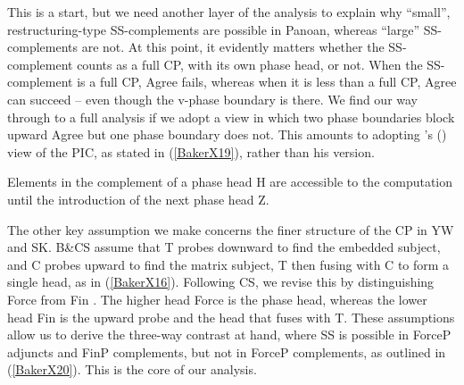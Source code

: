\documentclass[output=paper]{langscibook}
\begin{document}
This is a start, but we need another layer of the analysis to explain why “small”, restructuring-type SS-complements are possible in Panoan, whereas “large” SS-complements are not. At this point, it evidently matters whether the SS-com\-ple\-ment counts as a full CP, with its own phase head, or not. When the SS-complement is a full CP, Agree fails, whereas when it is less than a full CP, Agree can succeed – even though the v-phase boundary is there. We find our way through to a full analysis if we adopt a view in which two phase boundaries block upward Agree but one phase boundary does not. This amounts to adopting \citeauthor{chomsky2001derivation}'s (\citeyear[13--14]{chomsky2001derivation}) view of the PIC, as stated in (\ref{BakerX19}), rather than his \citeyearpar{chomsky2000minimalist} version.\largerpage

\begin{exe}
\ex Elements in the complement of a phase head H are accessible to the computation until the introduction of the next phase head Z. \label{BakerX19}
\end{exe}

The other key assumption we make concerns the finer structure of the CP in YW and SK. B\&CS assume that T probes downward to find the embedded subject, and C probes upward to find the matrix subject, T then fusing with C to form a single head, as in (\ref{BakerX16}). Following CS, we revise this by distinguishing Force from Fin \citep{rizzi1997fine}. The higher head Force is the phase head, whereas the lower head Fin is the upward probe and the head that fuses with T. These assumptions allow us to derive the three-way contrast at hand, where SS is possible in ForceP adjuncts and FinP complements, but not in ForceP complements, as outlined in (\ref{BakerX20}). This is the core of our analysis.
\end{document}
